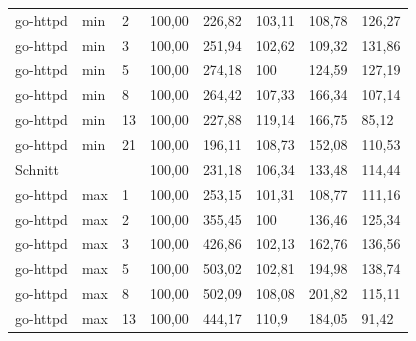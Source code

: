 \begin{footnotesize}
\begin{longtable}{llllllll}
		go-httpd       & min     & 2          & 100,00 & 226,82                      & 103,11                      & 108,78                      & 126,27                      \\
		go-httpd       & min     & 3          & 100,00 & 251,94                      & 102,62                      & 109,32                      & 131,86                      \\
		go-httpd       & min     & 5          & 100,00 & 274,18                      & \cellcolor[HTML]{C0C0C0}100 & 124,59                      & 127,19                      \\
		go-httpd       & min     & 8          & 100,00 & 264,42                      & 107,33                      & 166,34                      & 107,14                      \\
		go-httpd       & min     & 13         & 100,00 & 227,88                      & 119,14                      & 166,75                      & 85,12                       \\
		go-httpd       & min     & 21         & 100,00 & 196,11                      & 108,73                      & 152,08                      & 110,53                      \\ \hline
		Schnitt        &         &            & 100,00 & 231,18                      & 106,34                      & 133,48                      & 114,44                      \\ \hline
		go-httpd       & max     & 1          & 100,00 & 253,15                      & 101,31                      & 108,77                      & 111,16                      \\
		go-httpd       & max     & 2          & 100,00 & 355,45                      & \cellcolor[HTML]{C0C0C0}100 & 136,46                      & 125,34                      \\
		go-httpd       & max     & 3          & 100,00 & 426,86                      & 102,13                      & 162,76                      & 136,56                      \\
		go-httpd       & max     & 5          & 100,00 & 503,02                      & 102,81                      & 194,98                      & 138,74                      \\
		go-httpd       & max     & 8          & 100,00 & 502,09                      & 108,08                      & 201,82                      & 115,11                      \\
		go-httpd       & max     & 13         & 100,00 & 444,17                      & 110,9                       & 184,05                      & 91,42                       \\

\end{longtable}
\end{footnotesize}
